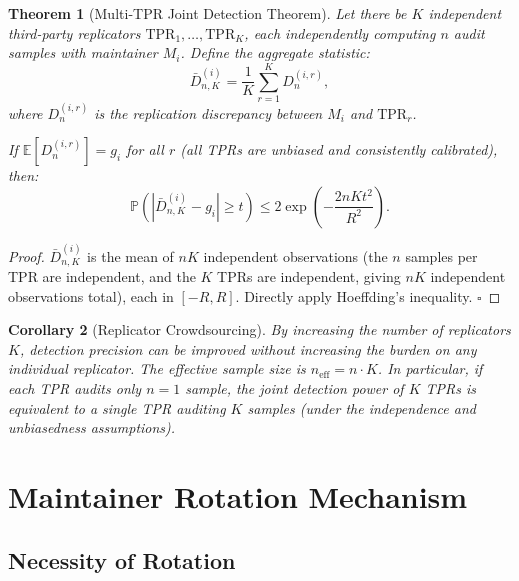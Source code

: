 \documentclass[11pt,a4paper]{article}
\newtheorem{theorem}{Theorem}[section]
\newtheorem{corollary}[theorem]{Corollary}
\theoremstyle{definition}
\newcommand{\E}{\mathbb{E}}
\newcommand{\Prob}{\mathbb{P}}
\begin{document}
\begin{theorem}[Multi-TPR Joint Detection Theorem]
\label{thm:multi_tpr}
Let there be $K$ independent third-party replicators $\text{TPR}_1, \ldots, \text{TPR}_K$, each independently computing $n$ audit samples with maintainer $M_i$. Define the aggregate statistic:
\begin{equation}\label{eq:agg_stat}
    \bar{D}_{n,K}^{(i)} = \frac{1}{K} \sum_{r=1}^{K} D_n^{(i,r)},
\end{equation}
where $D_n^{(i,r)}$ is the replication discrepancy between $M_i$ and $\text{TPR}_r$.

If $\E[D_n^{(i,r)}] = g_i$ for all $r$ (all TPRs are unbiased and consistently calibrated), then:
\begin{equation}\label{eq:multi_tpr_bound}
    \Prob\left(|\bar{D}_{n,K}^{(i)} - g_i| \geq t\right) \leq 2\exp\left(-\frac{2n K t^2}{R^2}\right).
\end{equation}
\end{theorem}

\begin{proof}
$\bar{D}_{n,K}^{(i)}$ is the mean of $nK$ independent observations (the $n$ samples per TPR are independent, and the $K$ TPRs are independent, giving $nK$ independent observations total), each in $[-R, R]$. Directly apply Hoeffding's inequality. \hfill $\square$
\end{proof}

\begin{corollary}[Replicator Crowdsourcing]
\label{cor:crowdsource}
By increasing the number of replicators $K$, detection precision can be improved without increasing the burden on any individual replicator. The effective sample size is $n_{\text{eff}} = n \cdot K$. In particular, if each TPR audits only $n=1$ sample, the joint detection power of $K$ TPRs is equivalent to a single TPR auditing $K$ samples (under the independence and unbiasedness assumptions).
\end{corollary}

\section{Maintainer Rotation Mechanism}

\subsection{Necessity of Rotation}
\end{document}
